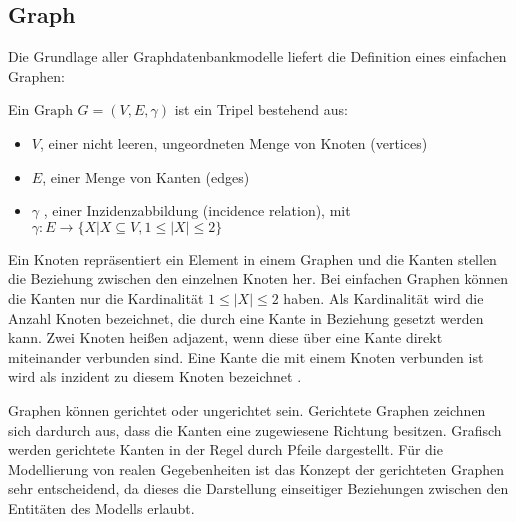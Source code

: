\subsection{Graph}
Die Grundlage aller Graphdatenbankmodelle liefert die Definition eines einfachen Graphen:
\begin{definition}
	Ein $\text{Graph } G=(V,E,\gamma)$ ist ein Tripel bestehend aus:
	\begin{itemize}
		\item $V$, einer nicht leeren, ungeordneten Menge von Knoten (vertices)
		\item $E$, einer Menge von Kanten (edges)
		\item $\gamma$ , einer Inzidenzabbildung (incidence relation), mit\\
		$\gamma : E \longrightarrow \{X | X \subseteq V, 1 \leq |X| \leq 2\}$
	\end{itemize}\cite[Seite 21]{pbeck01}
\end{definition}
Ein Knoten repräsentiert ein Element in einem Graphen und die Kanten stellen die Beziehung zwischen den einzelnen Knoten her.
Bei einfachen Graphen können die Kanten nur die Kardinalität $1 \leq |X| \leq 2$ haben.
Als Kardinalität wird die Anzahl Knoten bezeichnet, die durch eine Kante in Beziehung gesetzt werden kann.
Zwei Knoten heißen adjazent, wenn diese über eine Kante direkt miteinander verbunden sind.
Eine Kante die mit einem Knoten verbunden ist wird als inzident zu diesem Knoten bezeichnet \cite{knauer2015diskrete}.

Graphen können gerichtet oder ungerichtet sein.
Gerichtete Graphen zeichnen sich dardurch aus, dass die Kanten eine zugewiesene Richtung besitzen.
Grafisch werden gerichtete Kanten in der Regel durch Pfeile dargestellt.
Für die Modellierung von realen Gegebenheiten ist das Konzept der gerichteten Graphen sehr entscheidend, da dieses die Darstellung einseitiger Beziehungen zwischen den Entitäten des Modells erlaubt.

